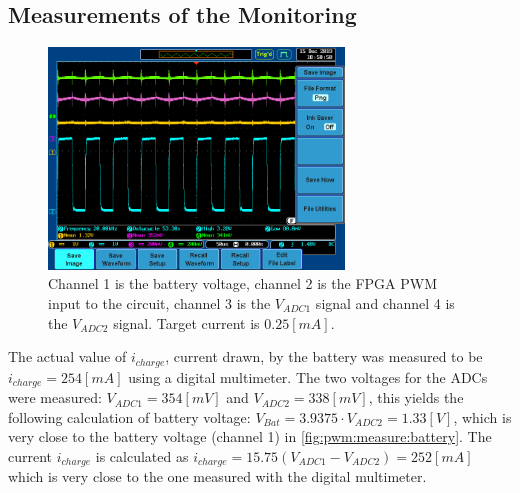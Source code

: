 \documentclass[../report.tex]{subfiles}
\begin{document}
\subsection{Measurements of the Monitoring}
\begin{figure}[H]
    \centering
    \includegraphics[width=0.7\textwidth]{figures/measurements/MONITOR.PNG}
    \caption{Channel 1 is the battery voltage, channel 2 is the FPGA PWM input to the circuit, channel 3 is the $V_{ADC1}$ signal and channel 4 is the $V_{ADC2}$ signal. Target current is $0.25[mA]$.}
    \label{fig:pwm:measure:battery}
\end{figure}
The actual value of $i_{charge}$, current drawn, by the battery was measured to be $i_{charge} = 254 [mA]$ using a digital multimeter. The two voltages for the ADCs were measured: $V_{ADC1} = 354 [mV]$ and $V_{ADC2} = 338 [mV]$, this yields the following calculation of battery voltage: $V_{Bat} = 3.9375\cdot V_{ADC2} = 1.33 [V]$, which is very close to the battery voltage (channel 1) in \autoref{fig:pwm:measure:battery}. The current $i_{charge}$ is calculated as $i_{charge} = 15.75 \left( V_{ADC1} - V_{ADC2} \right) = 252 [mA]$ which is very close to the one measured with the digital multimeter.
\end{document}
